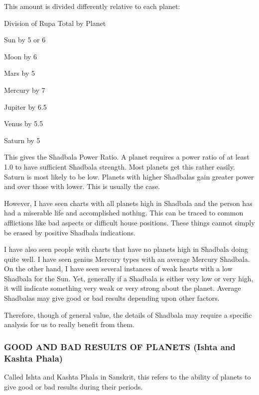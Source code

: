  

This amount is divided differently relative to each planet:

Division of Rupa Total by Planet

Sun                by 5 or 6

Moon              by 6

Mars               by 5

Mercury          by 7

Jupiter            by 6.5

Venus            by 5.5

Saturn            by 5

 

This gives the Shadbala Power Ratio. A planet requires a power ratio of at least 1.0 to have sufficient Shadbala strength. Most planets get this rather easily. Saturn is most likely to be low. Planets with higher Shadbalas gain greater power and over those with lower. This is usually the case.

 

However, I have seen charts with all planets high in Shadbala and the person has had a miserable life and accomplished nothing. This can be traced to common afflictions like bad aspects or difficult house positions. These things cannot simply be erased by positive Shadbala indications.

 

I have also seen people with charts that have no planets high in Shadbala doing quite well. I have seen genius Mercury types with an average Mercury Shadbala. On the other hand, I have seen several instances of weak hearts with a low Shadbala for the Sun. Yet, generally if a Shadbala is either very low or very high, it will indicate something very weak or very strong about the planet. Average Shadbalas may give good or bad results depending upon other factors.

 

Therefore, though of general value, the details of Shadbala may require a specific analysis for us to really benefit from them. 

 

\subsubsection{GOOD AND BAD RESULTS OF PLANETS (Ishta and Kashta Phala)}
 

Called Ishta and Kashta Phala in Sanskrit, this refers to the ability of planets to give good or bad results during their periods.

